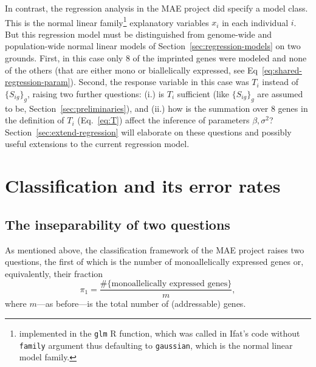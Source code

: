 \documentclass[letterpaper]{article}
\begin{document}
In contrast, the regression analysis in the MAE project did specify a model
class.  This is the normal linear family\footnote{implemented in the
\texttt{glm} R function, which was called in Ifat's code without
\texttt{family} argument thus defaulting to \texttt{gaussian}, which is the
normal linear model family.  } explanatory variables \(x_i\) in each
individual \(i\).  But this regression model must be distinguished from
genome-wide and population-wide normal linear models of
Section~\ref{sec:regression-models} on two grounds.  First, in this case only
8 of the imprinted genes were modeled and none of the others (that are either
mono or biallelically expressed, see Eq~\ref{eq:shared-regression-param}).
Second, the response variable in this case was \(T_i\) instead of
\(\{S_{ig}\}_g\), raising two further questions: (i.) is \(T_i\) sufficient
(like \(\{S_{ig}\}_g\) are assumed to be, Section~\ref{sec:preliminaries}),
and (ii.) how is the summation over 8 genes in the definition of \(T_i\)
(Eq.~\ref{eq:T}) affect the inference of parameters \(\beta,\sigma^2\)?
Section~\ref{sec:extend-regression} will elaborate on these questions and
possibly useful extensions to the current regression model.

\section{Classification and its error rates}
\label{sec:error-rates}

\subsection{The inseparability of two questions}

As mentioned above, the classification framework of the MAE project raises
two questions, the first of which is the number of monoallelically expressed genes
or, equivalently, their fraction
\begin{equation}
\label{eq:pi1}
\pi_1 = \frac{\#\{\text{monoallelically expressed genes}\}}{m},
\end{equation}
where \(m\)---as before---is the total number of (addressable) genes.
\end{document}
